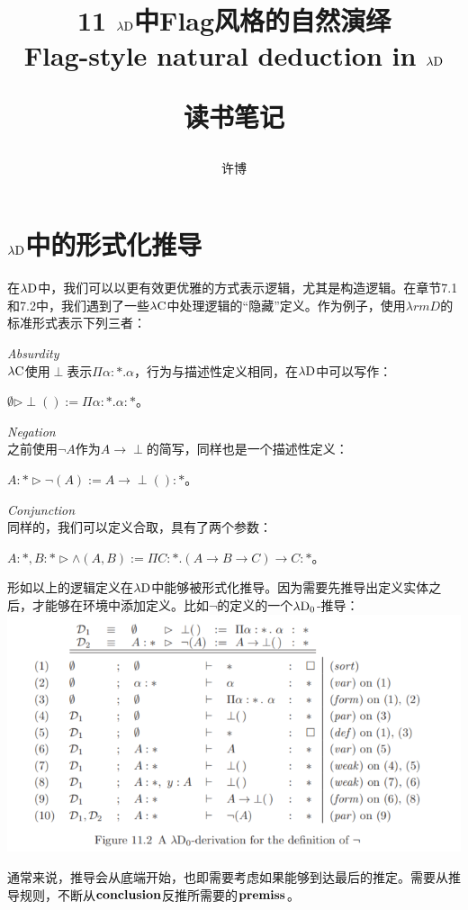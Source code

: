 \documentclass[UTF8]{article}
\title{11 $\lambda{\rm D}$中Flag风格的自然演绎\\Flag-style natural deduction in $\lambda{\rm D}$\\[2ex]\begin{large}读书笔记\end{large}}
\author{许博}
\date{}
\begin{document}
\maketitle
	\section{$\lambda{\rm D}$中的形式化推导}
	\noindent
	在$\lambda{\rm D}$中，我们可以以更有效更优雅的方式表示逻辑，尤其是构造逻辑。在章节7.1和7.2中，我们遇到了一些$\lambda{\rm C}$中处理逻辑的“隐藏”定义。作为例子，使用$\lambda{rm D}$的标准形式表示下列三者：
	
	\noindent
	\textit{Absurdity}\\
	$\lambda{\rm C}$使用$\perp$表示$\Pi\alpha:*.\alpha$，行为与描述性定义相同，在$\lambda{\rm D}$中可以写作：
	
		$\emptyset\triangleright\perp():=\Pi\alpha:*.\alpha:*$。
		
	\noindent
	\textit{Negation}\\
	之前使用$\neg A$作为$A\rightarrow\perp$的简写，同样也是一个描述性定义：
	
		$A:*\triangleright\neg(A):=A\rightarrow\perp():*$。
	
	\noindent
	\textit{Conjunction}\\
	同样的，我们可以定义合取，具有了两个参数：
	
		$A:*,B:*\triangleright\land(A,B):=\Pi C:*.(A\rightarrow B\rightarrow C)\rightarrow C:*$。
		
		形如以上的逻辑定义在$\lambda{\rm D}$中能够被形式化推导。因为需要先推导出定义实体之后，才能够在环境中添加定义。比如$\neg$的定义的一个$\lambda{\rm D_0}$-推导：\\
		\includegraphics[width=0.93\linewidth]{"../imgs/11-1.png"}
		
		通常来说，推导会从底端开始，也即需要考虑如果能够到达最后的推定。需要从推导规则，不断从$\bf conclusion$反推所需要的$\bf premiss$。
	
\end{document}
